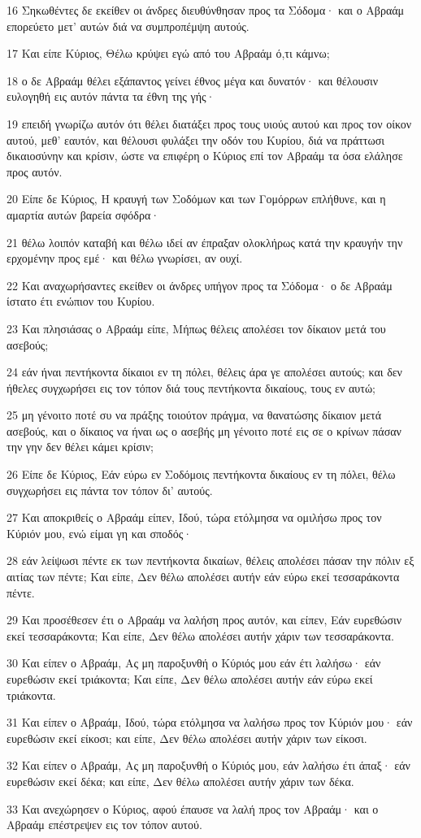 \par 16 Σηκωθέντες δε εκείθεν οι άνδρες διευθύνθησαν προς τα Σόδομα· και ο Αβραάμ επορεύετο μετ' αυτών διά να συμπροπέμψη αυτούς.
\par 17 Και είπε Κύριος, Θέλω κρύψει εγώ από του Αβραάμ ό,τι κάμνω;
\par 18 ο δε Αβραάμ θέλει εξάπαντος γείνει έθνος μέγα και δυνατόν· και θέλουσιν ευλογηθή εις αυτόν πάντα τα έθνη της γής·
\par 19 επειδή γνωρίζω αυτόν ότι θέλει διατάξει προς τους υιούς αυτού και προς τον οίκον αυτού, μεθ' εαυτόν, και θέλουσι φυλάξει την οδόν του Κυρίου, διά να πράττωσι δικαιοσύνην και κρίσιν, ώστε να επιφέρη ο Κύριος επί τον Αβραάμ τα όσα ελάλησε προς αυτόν.
\par 20 Είπε δε Κύριος, Η κραυγή των Σοδόμων και των Γομόρρων επλήθυνε, και η αμαρτία αυτών βαρεία σφόδρα·
\par 21 θέλω λοιπόν καταβή και θέλω ιδεί αν έπραξαν ολοκλήρως κατά την κραυγήν την ερχομένην προς εμέ· και θέλω γνωρίσει, αν ουχί.
\par 22 Και αναχωρήσαντες εκείθεν οι άνδρες υπήγον προς τα Σόδομα· ο δε Αβραάμ ίστατο έτι ενώπιον του Κυρίου.
\par 23 Και πλησιάσας ο Αβραάμ είπε, Μήπως θέλεις απολέσει τον δίκαιον μετά του ασεβούς;
\par 24 εάν ήναι πεντήκοντα δίκαιοι εν τη πόλει, θέλεις άρα γε απολέσει αυτούς; και δεν ήθελες συγχωρήσει εις τον τόπον διά τους πεντήκοντα δικαίους, τους εν αυτώ;
\par 25 μη γένοιτο ποτέ συ να πράξης τοιούτον πράγμα, να θανατώσης δίκαιον μετά ασεβούς, και ο δίκαιος να ήναι ως ο ασεβής μη γένοιτο ποτέ εις σε ο κρίνων πάσαν την γην δεν θέλει κάμει κρίσιν;
\par 26 Είπε δε Κύριος, Εάν εύρω εν Σοδόμοις πεντήκοντα δικαίους εν τη πόλει, θέλω συγχωρήσει εις πάντα τον τόπον δι' αυτούς.
\par 27 Και αποκριθείς ο Αβραάμ είπεν, Ιδού, τώρα ετόλμησα να ομιλήσω προς τον Κύριόν μου, ενώ είμαι γη και σποδός·
\par 28 εάν λείψωσι πέντε εκ των πεντήκοντα δικαίων, θέλεις απολέσει πάσαν την πόλιν εξ αιτίας των πέντε; Και είπε, Δεν θέλω απολέσει αυτήν εάν εύρω εκεί τεσσαράκοντα πέντε.
\par 29 Και προσέθεσεν έτι ο Αβραάμ να λαλήση προς αυτόν, και είπεν, Εάν ευρεθώσιν εκεί τεσσαράκοντα; Και είπε, Δεν θέλω απολέσει αυτήν χάριν των τεσσαράκοντα.
\par 30 Και είπεν ο Αβραάμ, Ας μη παροξυνθή ο Κύριός μου εάν έτι λαλήσω· εάν ευρεθώσιν εκεί τριάκοντα; Και είπε, Δεν θέλω απολέσει αυτήν εάν εύρω εκεί τριάκοντα.
\par 31 Και είπεν ο Αβραάμ, Ιδού, τώρα ετόλμησα να λαλήσω προς τον Κύριόν μου· εάν ευρεθώσιν εκεί είκοσι; και είπε, Δεν θέλω απολέσει αυτήν χάριν των είκοσι.
\par 32 Και είπεν ο Αβραάμ, Ας μη παροξυνθή ο Κύριός μου, εάν λαλήσω έτι άπαξ· εάν ευρεθώσιν εκεί δέκα; και είπε, Δεν θέλω απολέσει αυτήν χάριν των δέκα.
\par 33 Και ανεχώρησεν ο Κύριος, αφού έπαυσε να λαλή προς τον Αβραάμ· και ο Αβραάμ επέστρεψεν εις τον τόπον αυτού.

